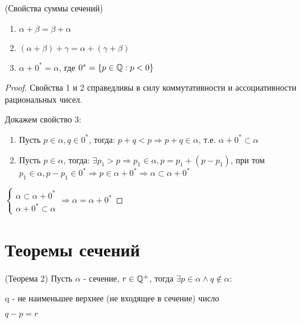 \begin{theorem} (Свойства суммы сечений)
    \label{properties_of_sections}
    \begin{enumerate}
        \item $\alpha + \beta = \beta + \alpha$
        \item $(\alpha + \beta) + \gamma = \alpha + (\gamma + \beta)$
        \item $\alpha + 0^* = \alpha$, где $0^* = \{p \in \mathbb{Q}: p < 0\}$
    \end{enumerate}
\end{theorem}

\begin{proof}
    Свойства 1 и 2 справедливы в силу коммутативности и ассоциативности рациональных чисел.
    
    Докажем свойство 3:
    \begin{enumerate}
        \item Пусть $p \in \alpha, q \in 0^* $, тогда: $ p + q < p \Rightarrow p + q \in \alpha$, т.е. $\alpha + 0^* \subset \alpha$
        \item Пусть $p \in \alpha$, тогда: $\exists p_1 > p \Rightarrow p_1 \in \alpha, p = p_1 + (p - p_1)$, при том $p_1 \in \alpha, p - p_1 \in 0^* \Rightarrow p \in \alpha + 0^* \Rightarrow \alpha \subset \alpha + 0^*$
    \end{enumerate}

    $\begin{cases}
        \alpha \subset \alpha + 0^* \\
        \alpha + 0^* \subset \alpha
    \end{cases} \Rightarrow \alpha = \alpha + 0^*$
\end{proof}

\section{Теоремы сечений}

\begin{theorem} (Теорема 2)
    \label{theorem_2_of_sections}
    Пусть $\alpha$ - сечение, $r \in \mathbb{Q}^+$, тогда $\exists p \in \alpha \land q \notin \alpha$:

    q - не наименьшее верхнее (не входящее в сечение) число

    $q - p = r$
\end{theorem}


